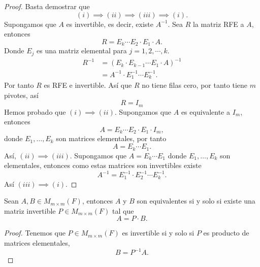 \documentclass[12pt,a4paper]{book}
\begin{document}
    \begin{proof}
        Basta demostrar que
        $$(i)\implies (ii)\implies (iii)\implies (i).$$
        Supongamos que $A$ es invertible, es decir, existe $A^{-1}$. Sea $R$ la matriz RFE
        a $A$, entonces
        \begin{equation*}
            R=E_{k}\cdots E_{2}\cdot E_{1}\cdot A.
        \end{equation*}
        Donde $E_{j}$ es una matriz elemental para $j=1,2,\cdots,k$.
        \begin{align*}
            R^{-1}&=(E_{k}\cdot E_{k-1}\cdots E_{1}\cdot A)^{-1}\\
            &=A^{-1}\cdot E_{1}^{-1}\cdots E_{k}^{-1}.
        \end{align*}
        Por tanto $R$ es RFE e invertible. Así que $R$ no tiene filas cero, por tanto tiene
        $m$ pivotes, así
        \begin{equation*}
            R=I_{m}
        \end{equation*}
        Hemos probado que $(i)\implies (ii)$. Supongamos que $A$ es equivalente a $I_{m}$, entonces
        \begin{equation*}
            A=E_{k}\cdots E_{2}\cdot E_{1}\cdot I_{m},
        \end{equation*}
        donde $E_{1},\dots,E_{k}$ son matrices elementales, por tanto
        \begin{equation*}
            A=E_{k}\cdots E_{1}.
        \end{equation*}
        Así, $(ii)\implies (iii)$. Supongamos que $A=E_{k}\cdots E_{1}$ donde $E_{1},\dots,E_{k}$
        son elementales, entonces como estas matrices son invertibles existe
        \begin{equation*}
            A^{-1}=E_{1}^{-1}\cdot E_{2}^{-1}\cdots E_{k}^{-1}.
        \end{equation*}
        Así $(iii)\implies (i)$.
    \end{proof}

    \begin{corolario}
        Sean $A,B\in M_{m\times m}(F)$, entonces $A$ y $B$ son equivalentes si y solo si
        existe una matriz invertible $P\in M_{m\times m}(F)$ tal que
        \begin{equation*}
            A=P\cdot B.
        \end{equation*}
    \end{corolario}

    \begin{proof}
        Tenemos que $P\in M_{m\times m}(F)$ es invertible si y solo si $P$ es producto de matrices elementales,
        \begin{equation*}
            B=P^{-1}A.
        \end{equation*}
    \end{proof}
\end{document}
